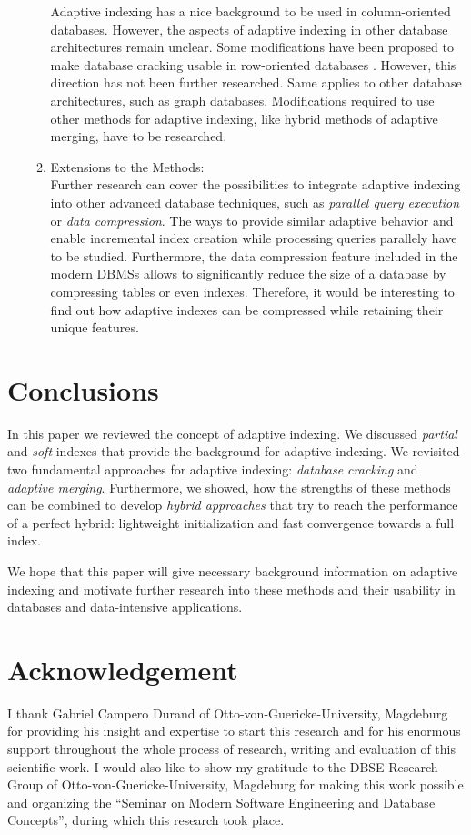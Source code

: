 \documentclass[10pt, conference, compsocconf]{IEEEtran}
\begin{document}
\begin{itemize}
\begin{enumerate}
Adaptive indexing has a nice background to be used in column-oriented databases. However, the aspects of adaptive indexing in other database architectures remain unclear. Some modifications have been proposed to make database cracking usable in row-oriented databases \cite{cracking}. However, this direction has not been further researched. Same applies to other database architectures, such as graph databases. Modifications required to use other methods for adaptive indexing, like hybrid methods of adaptive merging, have to be researched.\\
\item{Extensions to the Methods:}\\
Further research can cover the possibilities to integrate adaptive indexing into other advanced database techniques, such as \emph{parallel query execution} or \emph{data compression}. The ways to provide similar adaptive behavior and enable incremental index creation while processing queries parallely have to be studied. Furthermore, the data compression feature included in the modern DBMSs allows to significantly reduce the size of a database by compressing tables or even indexes. Therefore, it would be interesting to find out how adaptive indexes can be compressed while retaining their unique features.
\end{enumerate}
\end{itemize}

\section{Conclusions}
\label{sec:conc}
In this paper we reviewed the concept of adaptive indexing. We discussed \emph{partial} and \emph{soft} indexes that provide the background for adaptive indexing. We revisited two fundamental approaches for adaptive indexing: \emph{database cracking} and \emph{adaptive merging}. Furthermore, we showed, how the strengths of these methods can be combined to develop \emph{hybrid approaches} that try to reach the performance of a perfect hybrid: lightweight initialization and fast convergence towards a full index.

We hope that this paper will give necessary background information on adaptive indexing and motivate further research into these methods and their usability in databases and data-intensive applications.

\section*{Acknowledgement}
I thank Gabriel Campero Durand of Otto-von-Guericke-University, Magdeburg for providing his insight and expertise to start this research and for his enormous support throughout the whole process of research, writing and evaluation of this scientific work. I would also like to show my gratitude to the DBSE Research Group of Otto-von-Guericke-University, Magdeburg for making this work possible and organizing the ``Seminar on Modern Software Engineering and Database Concepts'', during which this research took place.
\end{document}
